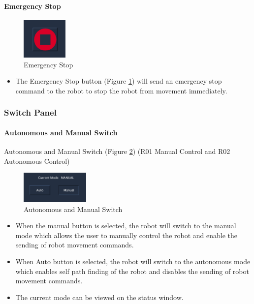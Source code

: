 \documentclass[12pt,a4paper]{article}
\begin{document}
\paragraph{Emergency Stop} \label{EMERGENCYSTOP} 
\begin{figure}[!htb]
\centering
\includegraphics[width=0.2\textwidth]{EmergencyStop}
\caption{Emergency Stop}
\label{emergency stop}
\end{figure}
\begin{itemize}
\item The Emergency Stop button (Figure \ref{emergency stop}) will send an emergency stop command to the robot to stop the robot from movement immediately.
\end{itemize}

\subsubsection{Switch Panel} 
\paragraph{Autonomous and Manual Switch}\label{CONTROLSWITCH}
Autonomous and Manual Switch (Figure \ref{control switch}) (R01 Manual Control and R02 Autonomous Control)\\
\begin{figure}[!htb]
\centering
\includegraphics[width=0.3\textwidth]{AutoManualSwitcher}
\caption{Autonomous and Manual Switch}
\label{control switch}
\end{figure}
\begin{itemize}  
\item When the manual button is selected, the robot will switch to the manual mode which allows the user to manually control the robot and enable the sending of robot movement commands.
\item When Auto button is selected, the robot will switch to the autonomous mode which enables self path finding of the robot and disables the sending of robot movement commands.
\item The current mode can be viewed on the status window.
\end{itemize}
\end{document}
